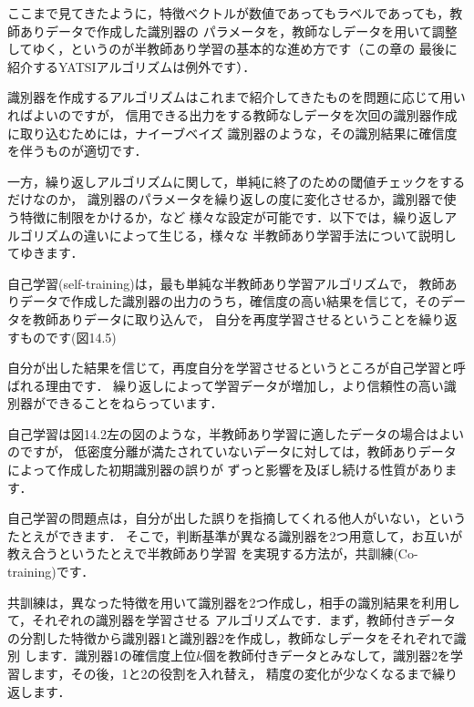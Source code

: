

ここまで見てきたように，特徴ベクトルが数値であってもラベルであっても，教師ありデータで作成した識別器の
パラメータを，教師なしデータを用いて調整してゆく，というのが半教師あり学習の基本的な進め方です（この章の
最後に紹介するYATSIアルゴリズムは例外です）．

識別器を作成するアルゴリズムはこれまで紹介してきたものを問題に応じて用いればよいのですが，
信用できる出力をする教師なしデータを次回の識別器作成に取り込むためには，ナイーブベイズ
識別器のような，その識別結果に確信度を伴うものが適切です．

一方，繰り返しアルゴリズムに関して，単純に終了のための閾値チェックをするだけなのか，
識別器のパラメータを繰り返しの度に変化させるか，識別器で使う特徴に制限をかけるか，など
様々な設定が可能です．以下では，繰り返しアルゴリズムの違いによって生じる，様々な
半教師あり学習手法について説明してゆきます．



自己学習(self-training)は，最も単純な半教師あり学習アルゴリズムで，
教師ありデータで作成した識別器の出力のうち，確信度の高い結果を信じて，そのデータを教師ありデータに取り込んで，
自分を再度学習させるということを繰り返すものです(図14.5)


自分が出した結果を信じて，再度自分を学習させるというところが自己学習と呼ばれる理由です．
繰り返しによって学習データが増加し，より信頼性の高い識別器ができることをねらっています．


自己学習は図14.2左の図のような，半教師あり学習に適したデータの場合はよいのですが，
低密度分離が満たされていないデータに対しては，教師ありデータによって作成した初期識別器の誤りが
ずっと影響を及ぼし続ける性質があります．



自己学習の問題点は，自分が出した誤りを指摘してくれる他人がいない，というたとえができます．
そこで，判断基準が異なる識別器を2つ用意して，お互いが教え合うというたとえで半教師あり学習
を実現する方法が，共訓練(Co-training)です．


共訓練は，異なった特徴を用いて識別器を2つ作成し，相手の識別結果を利用して，それぞれの識別器を学習させる
アルゴリズムです．まず，教師付きデータの分割した特徴から識別器1と識別器2を作成し，教師なしデータをそれぞれで識別
します．識別器1の確信度上位$k$個を教師付きデータとみなして，識別器2を学習します，その後，1と2の役割を入れ替え，
精度の変化が少なくなるまで繰り返します．

